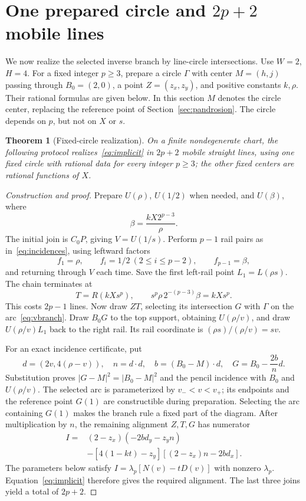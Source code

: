 \documentclass[11pt,a4paper]{article}
\newtheorem{theorem}{Theorem}[section]
\theoremstyle{remark}\newtheorem{remark}[theorem]{Remark}
\begin{document}
\section{One prepared circle and \texorpdfstring{$2p+2$}{2p+2} mobile lines}\label{sec:circle}
We now realize the selected inverse branch by line-circle intersections. Use $W=2$, $H=4$. For a fixed integer $p\ge3$, prepare a circle $\Gamma$ with center $M=(h,j)$ passing through $B_0=(2,0)$, a point $Z=(z_x,z_y)$, and positive constants $k,\rho$. Their rational formulas are given below. In this section $M$ denotes the circle center, replacing the reference point of Section~\ref{sec:pandrosion}. The circle depends on $p$, but not on $X$ or $s$.

\begin{theorem}[Fixed-circle realization]\label{thm:construction}
On a finite nondegenerate chart, the following protocol realizes~\eqref{eq:implicit} in $2p+2$ mobile straight lines, using one fixed circle with rational data for every integer $p\ge3$; the other fixed centers are rational functions of $X$.
\end{theorem}
\begin{proof}[Construction and proof]
Prepare $U(\rho)$, $U(1/2)$ when needed, and $U(\beta)$, where
\begin{equation}\label{eq:beta}
 \beta=\frac{kX2^{p-3}}\rho.
\end{equation}
The initial join is $C_0P$, giving $V=U(1/s)$. Perform $p-1$ rail pairs as in~\eqref{eq:incidences}, using leftward factors
\[
 f_1=\rho,\qquad f_i=1/2\ (2\le i\le p-2),\qquad f_{p-1}=\beta,
\]
and returning through $V$ each time. Save the first left-rail point $L_1=L(\rho s)$. The chain terminates at
\begin{equation}\label{eq:T}
 T=R(kXs^p),\qquad s^p\rho\,2^{-(p-3)}\beta=kXs^p.
\end{equation}
This costs $2p-1$ lines. Now draw $ZT$, selecting its intersection $G$ with $\Gamma$ on the arc~\eqref{eq:vbranch}. Draw $B_0G$ to the top support, obtaining $U(\rho/v)$, and draw $U(\rho/v)L_1$ back to the right rail. Its rail coordinate is $(\rho s)/(\rho/v)=sv$.

For an exact incidence certificate, put
\[
 d=(2v,4(\rho-v)),\quad n=d\cdot d,\quad b=(B_0-M)\cdot d,
 \quad G=B_0-\frac{2b}{n}d.
\]
Substitution proves $|G-M|^2=|B_0-M|^2$ and the pencil incidence with $B_0$ and $U(\rho/v)$. The selected arc is parameterized by $v_-<v<v_+$; its endpoints and the reference point $G(1)$ are constructible during preparation. Selecting the arc containing $G(1)$ makes the branch rule a fixed part of the diagram. After multiplication by $n$, the remaining alignment $Z,T,G$ has numerator
\begin{align}
 I={}&(2-z_x)(-2bd_y-z_yn)\nonumber\\
 &-[4(1-kt)-z_y][(2-z_x)n-2bd_x].\label{eq:incidenceI}
\end{align}
The parameters below satisfy $I=\lambda_p[N(v)-tD(v)]$ with nonzero $\lambda_p$. Equation~\eqref{eq:implicit} therefore gives the required alignment. The last three joins yield a total of $2p+2$.
\end{proof}
\end{document}
